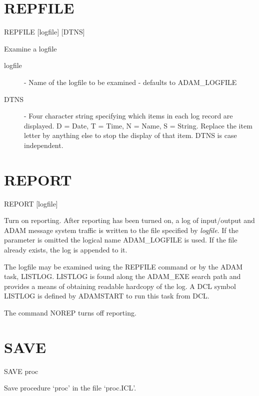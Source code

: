                                  
\section{REPFILE}

    REPFILE \hspace{.5cm} [logfile] \hspace{.5cm} [DTNS]

Examine a logfile

\begin{description}

\item[logfile] -  Name of the logfile to be examined - defaults to
ADAM\_LOGFILE

\item[DTNS]  -  Four character string specifying which items in each log 
record are displayed.
D = Date, T = Time, N = Name, S = String.
Replace the item letter by anything else to stop the display of that item.
DTNS is case independent.

\end{description}
        
\section{REPORT}

    REPORT \hspace{.5cm} [logfile]

Turn on reporting. After reporting has been turned on, a log of input/output and
ADAM message system traffic is written to the file specified by {\it logfile}.
If the parameter is omitted the logical name ADAM\_LOGFILE is used. 
If the file already exists, the log is appended to it.

The logfile may be examined using the REPFILE command or by the ADAM task,
LISTLOG. LISTLOG is found along the ADAM\_EXE search path and provides a means
of obtaining readable hardcopy of the log. A DCL symbol LISTLOG is defined
by ADAMSTART to run this task from DCL.

The command NOREP turns off reporting.


\section{SAVE}

   SAVE \hspace{.5cm} proc

 Save procedure `proc' in the file `proc.ICL'. 

